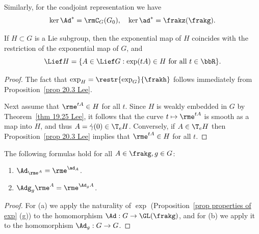 Similarly, for the coadjoint representation we have
\[\ker \Ad^\ast=\rmC_G(G_0),\quad \ker\ad^\ast=\frakz(\frakg).\]

\begin{prop}\label{prop 20.9 Lee}
    If $H\subset G$ is a Lie subgroup, then the exponential map of $H$ coincides with the restriction of the exponential map of $G$, and 
    \[\Lief H=\{A\in\Lief G: \exp(tA)\in H \text{ for all } t\in \bbR\}.\]
\end{prop}
\begin{proof}
    The fact that $\exp_H=\restr{\exp_G}{\frakh}$ follows immediately from Proposition~\ref{prop 20.3 Lee}.

    Next assume that $\rme^{tA}\in H$ for all $t$. Since $H$ is weakly embedded in $G$ by Theorem~\ref{thm 19.25 Lee}, it follows that the curve $t\mapsto \rme^{tA}$ is smooth as a map into $H$, and thus $A=\dot\gamma(0)\in \T_eH$. Conversely, if $A\in \T_e H$ then Proposition~\ref{prop 20.3 Lee} implies that $\rme^{tA}\in H$ for all $t$.
\end{proof}


\begin{thm}\label{thm 1.5.2 DK}
    The following formulas hold for all $A\in\frakg,g\in G$:
    \begin{enumerate}[label=(\alph*)]
        \item $\Ad_{\rme^A}=\rme^{\ad_A}$.
        \item $\Adg_g \rme^A=\rme^{\Ad_g A}$.
    \end{enumerate}
\end{thm}
\begin{proof}
    For (a) we apply the naturality of $\exp$ (Proposition~\ref{prop properties of exp} (g)) to the homomorphism $\Ad:G\to \GL(\frakg)$, and for (b) we apply it to the homomorphism $\Ad_g:G\to G$.
\end{proof}



